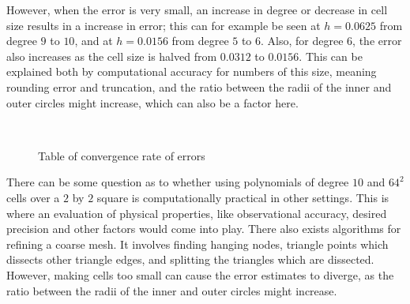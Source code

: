 However, when the error is very small, an increase in degree or decrease in cell size results in 
a increase in error; this can for example be seen at $h=0.0625$ from degree $9$ to $10$, and 
at $h=0.0156$ from degree $5$ to $6$. 
Also, for degree $6$, the error also increases as the cell size is halved from $0.0312$ to $0.0156$.
This can be explained both by computational accuracy for 
numbers of this size, meaning rounding error and truncation, and the ratio between the radii of the
inner and outer circles might increase, which can also be a factor here.
\begin{figure}[ht]
    \center~
    \caption{Table of convergence rate of errors}\label{tab:convergence}
\end{figure}
There can be some question as to whether using polynomials of degree $10$ and $64^2$ cells over a 
$2$ by $2$ square is computationally practical in other settings. 
This is where an evaluation of physical properties, like observational accuracy, desired precision and other 
factors would come into play.
There also exists algorithms for refining a coarse mesh. It involves finding hanging nodes, triangle 
points which dissects other triangle edges, and splitting the triangles which are dissected. 
However, making cells too small can cause the error estimates to diverge, as the ratio between the radii of the
inner and outer circles might increase.